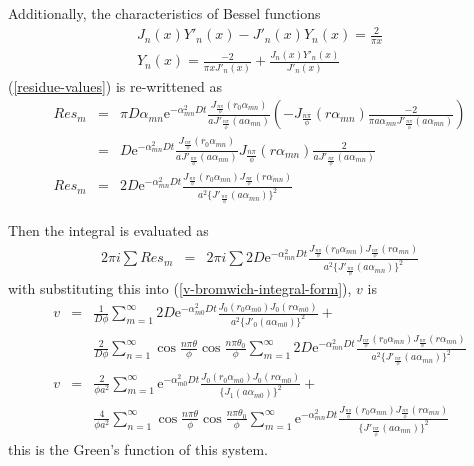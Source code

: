 \documentclass{article}
\begin{document}
Additionally, the characteristics of Bessel functions
\begin{eqnarray}
    J_n(x)Y'_n(x) - J'_n(x)Y_n(x) = \frac{2}{\pi x} \nonumber \\
    Y_n(x) = \frac{-2}{\pi xJ'_n(x)} + \frac{J_n(x)Y'_n(x)}{J'_n(x)}
\end{eqnarray}
(\ref{residue-values}) is re-writtened as
\begin{eqnarray}
   Res_m &=& \pi D\alpha_{mn}\mathrm{e}^{-\alpha_{mn}^2Dt}
   \frac{J_{\frac{n\pi}{\phi}}(r_0\alpha_{mn})}
        {aJ'_{\frac{n\pi}{\phi}}(a\alpha_{mn})}
      \left(-J_{\frac{n\pi}{\phi}}(r\alpha_{mn})
      \frac{-2}{\pi a\alpha_{mn}J'_{\frac{n\pi}{\phi}}(a\alpha_{mn})}\right) \nonumber \\
   &=& D\mathrm{e}^{-\alpha_{mn}^2Dt}
   \frac{J_{\frac{n\pi}{\phi}}(r_0\alpha_{mn})}
        {aJ'_{\frac{n\pi}{\phi}}(a\alpha_{mn})}
      J_{\frac{n\pi}{\phi}}(r\alpha_{mn})
      \frac{2}{aJ'_{\frac{n\pi}{\phi}}(a\alpha_{mn})} \nonumber \\
    Res_m &=& 2D\mathrm{e}^{-\alpha_{mn}^2Dt}
    \frac{J_{\frac{n\pi}{\phi}}(r_0\alpha_{mn})
          J_{\frac{n\pi}{\phi}}(r\alpha_{mn})}
         {a^2\{J'_{\frac{n\pi}{\phi}}(a\alpha_{mn})\}^2}
    \label{residue-values-only-J}
\end{eqnarray}

Then the integral is evaluated as
\begin{eqnarray}
    2\pi i\sum Res_m &=& 2\pi i\sum2D\mathrm{e}^{-\alpha_{mn}^2Dt}
    \frac{J_{\frac{n\pi}{\phi}}(r_0\alpha_{mn})
          J_{\frac{n\pi}{\phi}}(r\alpha_{mn})}
         {a^2\{J'_{\frac{n\pi}{\phi}}(a\alpha_{mn})\}^2}
\end{eqnarray}
with substituting this into (\ref{v-bromwich-integral-form}), $v$ is 
\begin{eqnarray}
    v &=& \frac{1}{D\phi}
          \sum^{\infty}_{m=1}
          2D\mathrm{e}^{-\alpha_{m0}^2Dt}
          \frac{J_0(r_0\alpha_{m0})
                J_0(r\alpha_{m0})}
               {a^2\{J'_0(a\alpha_{m0})\}^2}+\nonumber\\
      & & \frac{2}{D\phi}\sum^{\infty}_{n=1}
          \cos\frac{n\pi\theta}{\phi}\cos\frac{n\pi\theta_0}{\phi}
          \sum^{\infty}_{m=1}
          2D\mathrm{e}^{-\alpha_{mn}^2Dt}
          \frac{J_{\frac{n\pi}{\phi}}(r_0\alpha_{mn})
                J_{\frac{n\pi}{\phi}}(r\alpha_{mn})}
               {a^2\{J'_{\frac{n\pi}{\phi}}(a\alpha_{mn})\}^2}\nonumber\\
    v &=& \frac{2}{\phi a^2} \sum^{\infty}_{m=1}
          \mathrm{e}^{-\alpha_{m0}^2Dt}
          \frac{J_0(r_0\alpha_{m0})
                J_0(r\alpha_{m0})}
               {\{J_1(a\alpha_{m0})\}^2}+\nonumber\\
      & & \frac{4}{\phi a^2}\sum^{\infty}_{n=1}
          \cos\frac{n\pi\theta}{\phi}\cos\frac{n\pi\theta_0}{\phi}
          \sum^{\infty}_{m=1}
          \mathrm{e}^{-\alpha_{mn}^2Dt}
          \frac{J_{\frac{n\pi}{\phi}}(r_0\alpha_{mn})
                J_{\frac{n\pi}{\phi}}(r\alpha_{mn})}
               {\{J'_{\frac{n\pi}{\phi}}(a\alpha_{mn})\}^2}
\end{eqnarray}
this is the Green's function of this system.
\end{document}
